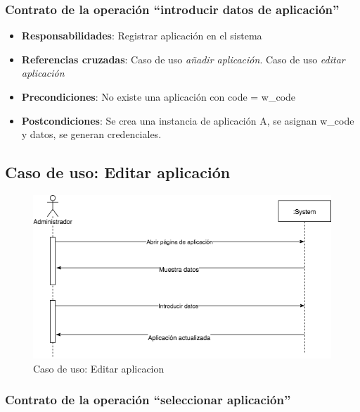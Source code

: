 \documentclass[12pt,a4paperpaper,]{report}
\providecommand{\tightlist}{%
  \setlength{\itemsep}{0pt}\setlength{\parskip}{0pt}}
\begin{document}
\subsubsection{\texorpdfstring{Contrato de la operación ``introducir
datos de
aplicación''}{Contrato de la operación introducir datos de aplicación}}\label{contrato-de-la-operaciuxf3n-introducir-datos-de-aplicaciuxf3n}

\begin{itemize}
\tightlist
\item
  \textbf{Responsabilidades}: Registrar aplicación en el sistema
\item
  \textbf{Referencias cruzadas}: Caso de uso \emph{añadir aplicación}.
  Caso de uso \emph{editar aplicación}
\item
  \textbf{Precondiciones}: No existe una aplicación con code = w\_code
\item
  \textbf{Postcondiciones}: Se crea una instancia de aplicación A, se
  asignan w\_code y datos, se generan credenciales.
\end{itemize}

\subsection{Caso de uso: Editar
aplicación}\label{caso-de-uso-editar-aplicaciuxf3n-1}

\begin{figure}
\centering
\includegraphics{source/figures/secuencia-editar-aplicacion.png}
\caption{Caso de uso: Editar aplicacion
\label{secuencia_editar_aplicacion}}
\end{figure}

\subsubsection{\texorpdfstring{Contrato de la operación ``seleccionar
aplicación''}{Contrato de la operación seleccionar aplicación}}\label{contrato-de-la-operaciuxf3n-seleccionar-aplicaciuxf3n}
\end{document}
